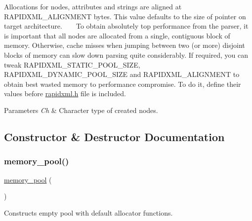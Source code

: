  Allocations for nodes, attributes and strings are aligned at {\ttfamily R\+A\+P\+I\+D\+X\+M\+L\+\_\+\+A\+L\+I\+G\+N\+M\+E\+NT} bytes. This value defaults to the size of pointer on target architecture. ~\newline
~\newline
 To obtain absolutely top performance from the parser, it is important that all nodes are allocated from a single, contiguous block of memory. Otherwise, cache misses when jumping between two (or more) disjoint blocks of memory can slow down parsing quite considerably. If required, you can tweak {\ttfamily R\+A\+P\+I\+D\+X\+M\+L\+\_\+\+S\+T\+A\+T\+I\+C\+\_\+\+P\+O\+O\+L\+\_\+\+S\+I\+ZE}, {\ttfamily R\+A\+P\+I\+D\+X\+M\+L\+\_\+\+D\+Y\+N\+A\+M\+I\+C\+\_\+\+P\+O\+O\+L\+\_\+\+S\+I\+ZE} and {\ttfamily R\+A\+P\+I\+D\+X\+M\+L\+\_\+\+A\+L\+I\+G\+N\+M\+E\+NT} to obtain best wasted memory to performance compromise. To do it, define their values before \mbox{\hyperlink{rapidxml_8h_source}{rapidxml.\+h}} file is included. 
\begin{DoxyParams}{Parameters}
{\em Ch} & Character type of created nodes. \\
\hline
\end{DoxyParams}


\subsection{Constructor \& Destructor Documentation}
\mbox{\label{classrapidxml_1_1memory__pool_af8fb3c8f1a564f8045c40bcd07a89866}} 
\subsubsection{\texorpdfstring{memory\+\_\+pool()}{memory\_pool()}}
{\footnotesize\ttfamily \mbox{\hyperlink{classrapidxml_1_1memory__pool}{memory\+\_\+pool}} (\begin{DoxyParamCaption}{ }\end{DoxyParamCaption})\hspace{0.3cm}{\ttfamily [inline]}}



Constructs empty pool with default allocator functions. 

\mbox{\label{classrapidxml_1_1memory__pool_a6f8c7990d9ec1ed2acf6558b238570eb}} 
